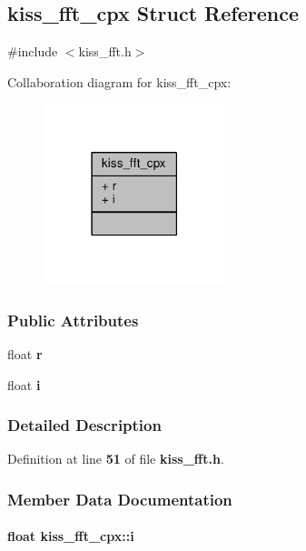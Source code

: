 \subsection{kiss\+\_\+fft\+\_\+cpx Struct Reference}
\label{structkiss__fft__cpx}


{\ttfamily \#include $<$kiss\+\_\+fft.\+h$>$}



Collaboration diagram for kiss\+\_\+fft\+\_\+cpx\+:
\nopagebreak
\begin{figure}[H]
\begin{center}
\leavevmode
\includegraphics[width=150pt]{d3/d76/structkiss__fft__cpx__coll__graph}
\end{center}
\end{figure}
\subsubsection*{Public Attributes}
\begin{DoxyCompactItemize}
\item 
float {\bf r}
\item 
float {\bf i}
\end{DoxyCompactItemize}


\subsubsection{Detailed Description}


Definition at line {\bf 51} of file {\bf kiss\+\_\+fft.\+h}.



\subsubsection{Member Data Documentation}
\paragraph[{i}]{\setlength{\rightskip}{0pt plus 5cm}float kiss\+\_\+fft\+\_\+cpx\+::i}\label{structkiss__fft__cpx_ad748a65db6b621cc546c853b0bc0d1af}


